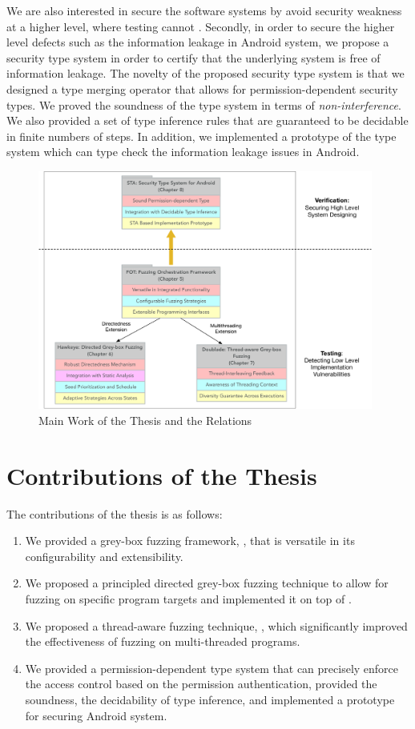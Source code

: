 We are also interested in secure the software systems by avoid security weakness at a higher level, where testing cannot . Secondly, in order to secure the higher level defects such as the information leakage in Android system, we propose a security type system in order to certify that the underlying system is free of information leakage. The novelty of the proposed security type system is that we designed a type merging operator that allows for permission-dependent security types. We proved the soundness of the type system in terms of \emph{non-interference}. We also provided a set of type inference rules that are guaranteed to be decidable in finite numbers of steps. In addition, we implemented a prototype of the type system which can type check the information leakage issues in Android.

\begin{figure}[ht]
	\begin{center}
		\includegraphics[width=0.98\textwidth]{res/contributions}
		\caption{Main Work of the Thesis and the Relations}
		\label{fig:works}
	\end{center}
\end{figure}

\section{Contributions of the Thesis}
The contributions of the thesis is as follows:
\begin{enumerate}
	\item We provided a grey-box fuzzing framework, \FOT, that is versatile in its configurability and extensibility.
	\item We proposed a principled directed grey-box fuzzing technique \dFOT to allow for fuzzing on specific program targets and implemented it on top of \FOT.
	\item We proposed a thread-aware fuzzing technique, \mtfuzz, which significantly improved the effectiveness of fuzzing on multi-threaded programs.
	\item We provided a permission-dependent type system that can precisely enforce the access control based on the permission authentication, provided the soundness, the decidability of type inference, and implemented a prototype for securing Android system.
\end{enumerate}


